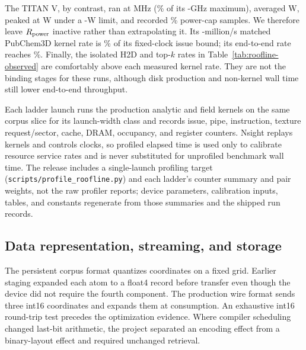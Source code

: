 The TITAN V, by contrast, ran at \RooflineTitanObservedClockMHz{} MHz
(\RooflineTitanClockFractionPercent\% of its \RooflineTitanSpecifiedMaxClockGHz-GHz maximum), averaged
\RooflineTitanMeanPowerW{} W, peaked at \RooflineTitanMaximumPowerW{} W under a
\RooflineTitanPowerLimitW-W limit, and recorded \RooflineTitanPowerCapPercent\% power-cap samples.
We therefore leave $R_{\rm power}$ inactive rather than extrapolating it. Its
\RooflineTitanKernelMillionPairsPerSecond{}-million/s matched PubChem3D kernel rate is
\RooflineTitanKernelToStructuralPercent\% of its fixed-clock issue bound; its
end-to-end rate reaches \RooflineTitanWallToStructuralPercent\%.
Finally, the isolated H2D and top-$k$ rates in
Table~\ref{tab:roofline-observed} are comfortably above each measured kernel
rate. They are not the binding stages for these runs, although disk production
and non-kernel wall time still lower end-to-end throughput.

Each ladder launch runs the production analytic and field kernels on the same
corpus slice for its launch-width class and records issue, pipe, instruction,
texture request/sector, cache, DRAM, occupancy, and register counters. Nsight
replays kernels and controls clocks, so profiled elapsed time is used only to
calibrate resource service rates and is never substituted for unprofiled
benchmark wall time. The release includes a single-launch profiling target
(\texttt{scripts/profile\_roofline.py}) and each ladder's counter summary and
pair weights, not the raw profiler reports; device parameters, calibration
inputs, tables, and constants regenerate from those summaries and the shipped
run records.

\subsection{Data representation, streaming, and storage}

The persistent corpus format quantizes coordinates on a fixed grid. Earlier
staging expanded each atom to a float4 record before transfer even though the
device did not require the fourth component. The production wire format sends
three int16 coordinates and expands them at consumption. An exhaustive int16
round-trip test precedes the optimization evidence. Where compiler scheduling
changed last-bit arithmetic, the project separated an encoding effect from a
binary-layout effect and required unchanged retrieval.


